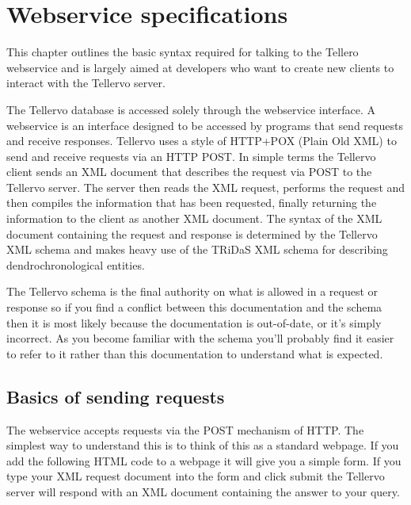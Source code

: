 \chapter{Webservice specifications}
\label{txt:webserviceSpec}

This chapter outlines the basic syntax required for talking to the Tellero webservice and is largely aimed at developers who want to create new clients to interact with the Tellervo server.

The Tellervo database is accessed solely through the webservice interface.  A webservice is an interface designed to be accessed by programs that send requests and receive responses.  Tellervo uses a style of HTTP+POX (Plain Old XML) to send and receive requests via an HTTP POST.  In simple terms the Tellervo client sends an XML document that describes the request via POST to the Tellervo server.  The server then reads the XML request, performs the request and then compiles the information that has been requested, finally returning the information to the client as another XML document.  The syntax of the XML document containing the request and response is determined by the Tellervo XML schema and makes heavy use of the TRiDaS XML schema for describing dendrochronological entities.

The Tellervo schema is the final authority on what is allowed in a request or response so if you find a conflict between this documentation and the schema then it is most likely because the documentation is out-of-date, or it's simply incorrect.  As you become familiar with the schema you'll probably find it easier to refer to it rather than this documentation to understand what is expected.

  



\section{Basics of sending requests}
The webservice accepts requests via the POST mechanism of HTTP.  The simplest way to understand this is to think of this as a standard webpage.  If you add the following HTML code to a webpage it will give you a simple form.  If you type your XML request document into the form and click submit the Tellervo server will respond with an XML document containing the answer to your query.

